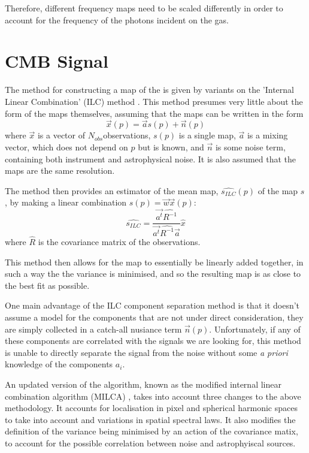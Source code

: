 Therefore, different frequency maps need to be scaled differently in order to account for the frequency of the photons incident on the gas. 


\section{CMB Signal}

The method for constructing a map of the \sze is given by variants on the 'Internal Linear Combination' (ILC) method \citep{2011MNRAS.410.2481R}. This method presumes very little about the form of the maps themselves, assuming that the maps can be written in the form 
\begin{equation}
\vec{x}(p) = \vec{a} s(p) + \vec{n}(p) 
\label{eq:ilc_1}
\end{equation}
where $\vec{x}$ is a vector of $N_{obs} $observations, $s(p)$ is a single map, $\vec{a}$ is a mixing vector, which does not depend on $p$ but is known, and $\vec{n}$ is some noise term, containing both instrument and astrophysical noise. It is also assumed that the maps are the same resolution.

The method then provides an estimator of the mean map, $\hat{s_{ILC}}(p)$ of the map $s$, by making a linear combination $\hat{s}(p) = \vec{w} \vec{x}(p)$:
\begin{equation}
\hat{s_{ILC}} = \frac{\vec{a^t} \hat{R^{-1}}}{\vec{a^t} \hat{R^{-1}} \vec{a}} \hat{x}
\end{equation}
where $\hat{R}$ is the covariance matrix of the observations. 

This method then allows for the map to essentially be linearly added together, in such a way the the variance is minimised, and so the resulting map is as close to the best fit as possible. 
\par One main advantage of the ILC component separation method is that it doesn't assume a model for the components that are not under direct consideration, they are simply collected in a catch-all nusiance term $\vec{n}(p)$. Unfortunately, if any of these components are correlated with the signals we are looking for, this method is unable to directly separate the signal from the noise without some \textit{a priori} knowledge of the components $a_i$.

An updated version of the algorithm, known as the modified internal linear combination algorithm (MILCA) \citep{2013A&A...558A.118H}, takes into account three changes to the above methodology. It accounts for localisation in pixel and spherical harmonic spaces to take into account and variations in spatial spectral laws. It also modifies the definition of the variance being minimised by an action of the covariance matix, to account for the possible correlation between noise and astrophyiscal sources.

